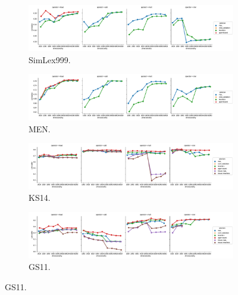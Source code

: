\begin{figure}
  \centering
  \begin{subfigure}[t]{\textwidth}

    \includegraphics[width=\textwidth]{supplement/figures/universal-results-simlex999}
    \caption{SimLex999.}
    \label{fig:universal-results-simlex}
  \end{subfigure}

  \begin{subfigure}[t]{\textwidth}
    \includegraphics[width=\textwidth]{supplement/figures/universal-results-men}
    \caption{MEN.}
    \label{fig:universal-results-men}
  \end{subfigure}


  \begin{subfigure}[t]{\textwidth}
    \includegraphics[width=\textwidth]{supplement/figures/universal-results-ks14}
    \caption{KS14.}
    \label{fig:universal-results-ks14}
  \end{subfigure}

  \begin{subfigure}[t]{\textwidth}
    \includegraphics[width=\textwidth]{supplement/figures/universal-results-gs11}
    \caption{GS11.}
    \label{fig:universal-results-gs11}
  \end{subfigure}


\end{figure}
